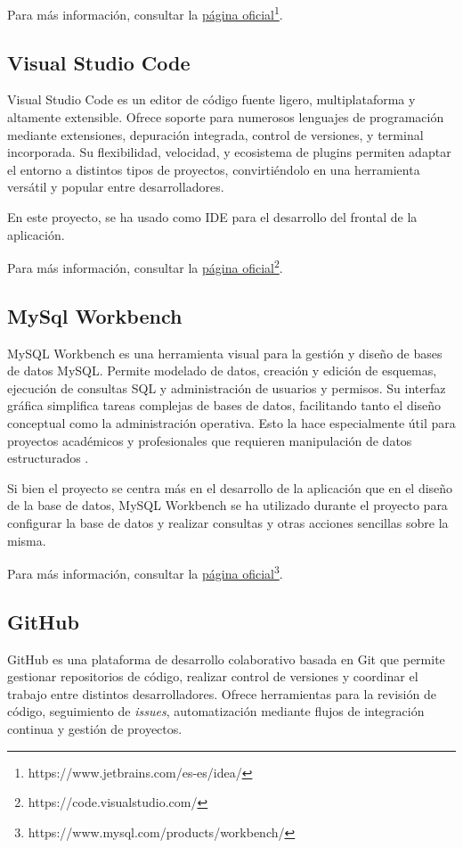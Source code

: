 \noindent Para más información, consultar la \href{https://www.jetbrains.com/es-es/idea/}{\uline{página oficial}\footnote{\url{https://www.jetbrains.com/es-es/idea/}}}.

\subsection{Visual Studio Code}
Visual Studio Code es un editor de código fuente ligero, multiplataforma y altamente extensible. Ofrece soporte para numerosos lenguajes de programación mediante extensiones, depuración integrada, control de versiones, y terminal incorporada. Su flexibilidad, velocidad, y ecosistema de plugins permiten adaptar el entorno a distintos tipos de proyectos, convirtiéndolo en una herramienta versátil y popular entre desarrolladores.

En este proyecto, se ha usado como IDE para el desarrollo del frontal de la aplicación.

\noindent Para más información, consultar la \href{https://code.visualstudio.com/}{\uline{página oficial}\footnote{\url{https://code.visualstudio.com/}}}.

\subsection{MySql Workbench}
MySQL Workbench es una herramienta visual para la gestión y diseño de bases de datos MySQL. Permite modelado de datos, creación y edición de esquemas, ejecución de consultas SQL y administración de usuarios y permisos. Su interfaz gráfica simplifica tareas complejas de bases de datos, facilitando tanto el diseño conceptual como la administración operativa. Esto la hace especialmente útil para proyectos académicos y profesionales que requieren manipulación de datos estructurados \cite{mysql}.

Si bien el proyecto se centra más en el desarrollo de la aplicación que en el diseño de la base de datos, MySQL Workbench se ha utilizado durante el proyecto para configurar la base de datos y realizar consultas y otras acciones sencillas sobre la misma.

\noindent Para más información, consultar la \href{https://www.mysql.com/products/workbench/}{\uline{página oficial}\footnote{\url{https://www.mysql.com/products/workbench/}}}.

\subsection{GitHub}
GitHub es una plataforma de desarrollo colaborativo basada en Git que permite gestionar repositorios de código, realizar control de versiones y coordinar el trabajo entre distintos desarrolladores. Ofrece herramientas para la revisión de código, seguimiento de \textit{issues}, automatización mediante flujos de integración continua y gestión de proyectos.

